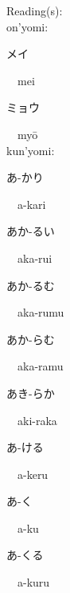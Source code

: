 \begin{multicols}{2}
Reading(s):\ \ \\
{\hspace*{1em}}on'yomi:\ \ \\
{\hspace*{2em}}{\begin{CJK}{UTF8}{min} メイ \end{CJK}}\ \ mei\ \ \\
{\hspace*{2em}}{\begin{CJK}{UTF8}{min} ミョウ \end{CJK}}\ \ my\=o\ \ \\
{\hspace*{1em}}kun'yomi:\ \ \\
{\hspace*{2em}}{\begin{CJK}{UTF8}{min} あ-かり \end{CJK}}\ \ a-kari\ \ \\
{\hspace*{2em}}{\begin{CJK}{UTF8}{min} あか-るい \end{CJK}}\ \ aka-rui\ \ \\
{\hspace*{2em}}{\begin{CJK}{UTF8}{min} あか-るむ \end{CJK}}\ \ aka-rumu\ \ \\
{\hspace*{2em}}{\begin{CJK}{UTF8}{min} あか-らむ \end{CJK}}\ \ aka-ramu\ \ \\
{\hspace*{2em}}{\begin{CJK}{UTF8}{min} あき-らか \end{CJK}}\ \ aki-raka\ \ \\
{\hspace*{2em}}{\begin{CJK}{UTF8}{min} あ-ける \end{CJK}}\ \ a-keru\ \ \\
{\hspace*{2em}}{\begin{CJK}{UTF8}{min} あ-く \end{CJK}}\ \ a-ku\ \ \\
{\hspace*{2em}}{\begin{CJK}{UTF8}{min} あ-くる \end{CJK}}\ \ a-kuru\ \ \\

\end{multicols}
